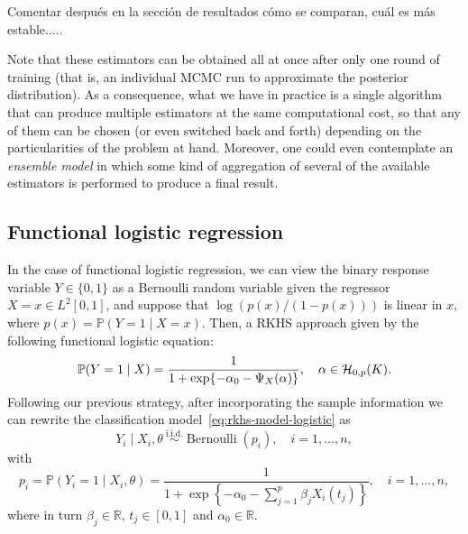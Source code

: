 \documentclass[ba]{imsart}
\numberwithin{equation}{section}
\theoremstyle{plain}
\newcommand{\R}{\mathbb{R}}
\newcommand{\Hcal}{\ensuremath\mathcal{H}}
\newenvironment{comment}[1][comment-red]
{
\noindent \color{#1}
}
{
\color{black}
}
\begin{document}
\begin{comment}
Comentar después en la sección de resultados cómo se comparan, cuál es más estable.....
\end{comment}


Note that these estimators can be obtained all at once after only one round of training (that is, an individual MCMC run to approximate the posterior distribution). As a consequence, what we have in practice is a single algorithm that can produce multiple estimators at the same computational cost, so that any of them can be chosen (or even switched back and forth) depending on the particularities of the problem at hand. Moreover, one could even contemplate an \textit{ensemble model} in which some kind of aggregation of several of the available estimators is performed to produce a final result.

\begin{comment}

\end{comment}

\subsection{Functional logistic regression}\label{sec:rkhs-logistic-model}

In the case of functional logistic regression, we can view the binary response variable \(Y\in\{0, 1\}\) as a Bernoulli random variable given the regressor \(X=x \in L^2[0, 1]\), and suppose that \(\log\left(p(x)/(1-p(x))\right)\) is linear in \(x\), where \(p(x)=\mathbb P(Y=1\mid X=x)\). Then, a RKHS approach given by the following functional logistic equation:
\begin{equation}\label{eq:rkhs-model-logistic}
  \mathbb P(Y=1 \mid X) = \frac{1}{1 + \exp\{-\alpha_0 - \Psi_X(\alpha)\}}, \quad \alpha \in \Hcal_{0,p}(K).
\end{equation}
Following our previous strategy, after incorporating the sample information we can rewrite the classification model~\eqref{eq:rkhs-model-logistic} as
\begin{equation}\label{eq:rkhs-model-logistic-2}
Y_i \mid X_i,\theta \ \stackrel{\text{i.i.d.}}{\sim} \operatorname{Bernoulli}(p_i), \quad i=1,\dots, n,
\end{equation}
with
\begin{equation}\label{eq:rkhs-model-logistic-2-parameter}
  p_i = \mathbb P(Y_i=1 \mid X_i,\theta) = \frac{1}{\displaystyle 1 + \exp\left\{-\alpha_0 - \sum_{j=1}^p \beta_j X_i(t_j)\right\}}, \quad i=1,\dots, n,
\end{equation}
where in turn \(\beta_j\in\R\), \(t_j\in[0, 1]\) and \(\alpha_0\in\R\).
\end{document}
